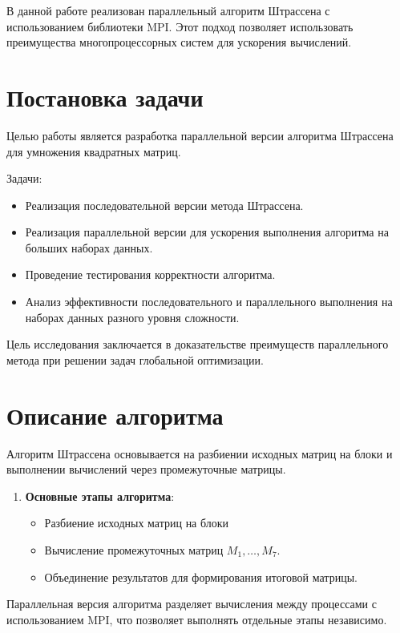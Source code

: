 \documentclass[a4paper,12pt]{article}
\begin{document}
В данной работе реализован параллельный алгоритм Штрассена с использованием библиотеки MPI. Этот подход позволяет использовать преимущества многопроцессорных систем для ускорения вычислений.

\section{Постановка задачи}

\hspace*{1.25em}Целью работы является разработка параллельной версии алгоритма Штрассена для умножения квадратных матриц.

Задачи:
\begin{itemize}
    \item Реализация последовательной версии метода Штрассена.
    \item Реализация параллельной версии для ускорения выполнения алгоритма на больших наборах данных.
    \item Проведение тестирования корректности алгоритма.
    \item Анализ эффективности последовательного и параллельного выполнения на наборах данных разного уровня сложности.
\end{itemize}

Цель исследования заключается в доказательстве преимуществ параллельного метода при решении задач глобальной оптимизации.

\section{Описание алгоритма}

\hspace*{1.25em}Алгоритм Штрассена основывается на разбиении исходных матриц на блоки и выполнении вычислений через промежуточные матрицы.

\begin{enumerate}
    \item \textbf{Основные этапы алгоритма}:
    \begin{itemize}
        \item Разбиение исходных матриц на блоки
        \item Вычисление промежуточных матриц $M_1, \dots, M_7$.
        \item Объединение результатов для формирования итоговой матрицы.
    \end{itemize}
\end{enumerate}
Параллельная версия алгоритма разделяет вычисления между процессами с использованием MPI, что позволяет выполнять отдельные этапы независимо.
\end{document}
